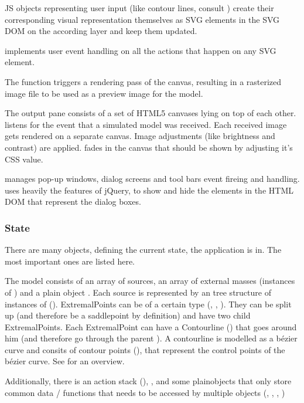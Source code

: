 JS objects representing user input (like contour lines, consult ) create their corresponding visual representation themselves as SVG elements in the SVG DOM on the according layer and keep them updated.

 implements user event handling on all the actions that happen on any SVG element.

The function  triggers a rendering pass of the canvas, resulting in a rasterized image file to be used as a preview image for the model.


The output pane  consists of a set of HTML5 canvases lying on top of each other.
 listens for the event that a simulated model was received.
Each received image gets rendered on a separate canvas.
Image adjustments (like brightness and contrast) are applied.
 fades in the canvas that should be shown by adjusting it's CSS  value.

 manages pop-up windows, dialog screens and tool bars event fireing and handling.
 uses heavily the features of jQuery, to show and hide the elements in the HTML DOM that represent the dialog boxes.



\subsubsection{State}
\label{sec:state}

There are many objects, defining the current state, the application is in.
The most important ones are listed here.

The model  consists of an array of sources, an array of external masses (instances of ) and a plain object .
Each source is represented by an tree structure of instances of  ().
ExtremalPoints can be of a certain type (, , ).
They can be split up (and therefore be a saddlepoint by definition) and have two child ExtremalPoints.
Each ExtremalPoint can have a Contourline () that goes around him (and therefore go through the parent ).
A contourline is modelled as a bézier curve and consits of contour points (), that represent the control points of the bézier curve. See  for an overview.

Additionally, there is an action stack (), , 
and some plainobjects that only store common data / functions that needs to be accessed by multiple objects (, , , )


